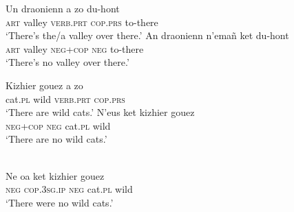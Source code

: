 \documentclass[output=paper]{langsci/langscibook}
\begin{document}
\begin{exe}\ex\label{ex:ieur-breton-valley}
\begin{xlist}
\ex\gll Un draonienn a zo du-hont \\
\textsc{art} valley \textsc{verb.prt} \textsc{cop.prs} to-there \\
    \glt `There's the/a valley over there.' 
\ex\gll An draonienn n’emañ ket du-hont\\
\textsc{art} valley \textsc{neg+cop} \textsc{neg} to-there\\
\glt `There's no valley over there.' 
\end{xlist}
%
\ex\label{ex:ieur-breton-wildcats}
\begin{xlist}
\ex\gll Kizhier gouez a zo \\
cat.\textsc{pl} wild \textsc{verb.prt} \textsc{cop.prs} \\
    \glt `There are wild cats.'
\ex\gll N’eus ket kizhier gouez \\
    \textsc{neg+cop} \textsc{neg} cat.\textsc{pl}   wild \\
    \glt `There are no wild cats.'
\end{xlist}
%
\ex\label{ex:ieur-breton-nowildcatspast}
\\
    \gll Ne oa ket kizhier gouez \\
\textsc{neg} \textsc{cop.3sg.ip} \textsc{neg} cat.\textsc{pl} wild \\
    \glt `There were no wild cats.'
\end{exe}
\end{document}
